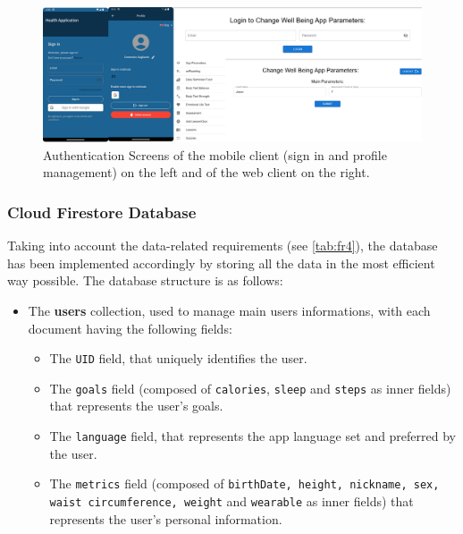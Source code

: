 \begin{figure}
    \includegraphics[width=1.0\linewidth]{./images/authenticationScreens.jpg}
    \caption{Authentication Screens of the mobile client (sign in and profile management) on the left and of the web client on the right.}
    \label{fig:authenticationScreens}
\end{figure}
\newpage
\subsubsection{Cloud Firestore Database}
\label{subsubsec:cloudFirestoreDatabase}
Taking into account the data-related requirements (see \cref{tab:fr4}), the database has been implemented accordingly by storing all the data in the most efficient way possible. \newline The database structure is as follows:

\begin{itemize}[nosep] %
    \item The \textbf{users} collection, used to manage main users informations, with each document having the following fields:
    \label{subsubsec:usersCollection}
    \begin{itemize}[nosep]
        \item The \texttt{UID} field, that uniquely identifies the user.
        \item The \texttt{goals} field (composed of \texttt{calories}, \texttt{sleep} and \texttt{steps} as inner fields) that represents the user's goals.
        \item The \texttt{language} field, that represents the app language set and preferred by the user.
        \item The \texttt{metrics} field (composed of \texttt{birthDate, height, nickname, sex, waist circumference, weight} and \texttt{wearable} as inner fields) that represents the user's personal information.
    \end{itemize}
\end{itemize}

